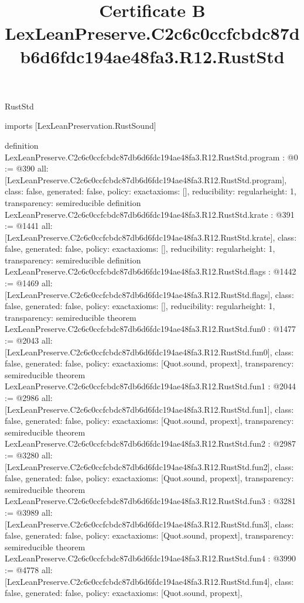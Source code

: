 \begin{lexlean}{RustStd}
\title{Certificate B LexLeanPreserve.C2c6c0ccfcbdc87db6d6fdc194ae48fa3.R12.RustStd}
\begin{coremodule}
imports [LexLeanPreservation.RustSound]

definition LexLeanPreserve.C2c6c0ccfcbdc87db6d6fdc194ae48fa3.R12.RustStd.program : @0 := @390 {
  all: [LexLeanPreserve.C2c6c0ccfcbdc87db6d6fdc194ae48fa3.R12.RustStd.program],
  class: false,
  generated: false,
  policy: exact{axioms: []},
  reducibility: regular{height: 1},
  transparency: semireducible
}
definition LexLeanPreserve.C2c6c0ccfcbdc87db6d6fdc194ae48fa3.R12.RustStd.krate : @391 := @1441 {
  all: [LexLeanPreserve.C2c6c0ccfcbdc87db6d6fdc194ae48fa3.R12.RustStd.krate],
  class: false,
  generated: false,
  policy: exact{axioms: []},
  reducibility: regular{height: 1},
  transparency: semireducible
}
definition LexLeanPreserve.C2c6c0ccfcbdc87db6d6fdc194ae48fa3.R12.RustStd.flags : @1442 := @1469 {
  all: [LexLeanPreserve.C2c6c0ccfcbdc87db6d6fdc194ae48fa3.R12.RustStd.flags],
  class: false,
  generated: false,
  policy: exact{axioms: []},
  reducibility: regular{height: 1},
  transparency: semireducible
}
theorem LexLeanPreserve.C2c6c0ccfcbdc87db6d6fdc194ae48fa3.R12.RustStd.fun0 : @1477 := @2043 {
  all: [LexLeanPreserve.C2c6c0ccfcbdc87db6d6fdc194ae48fa3.R12.RustStd.fun0],
  class: false,
  generated: false,
  policy: exact{axioms: [Quot.sound, propext]},
  transparency: semireducible
}
theorem LexLeanPreserve.C2c6c0ccfcbdc87db6d6fdc194ae48fa3.R12.RustStd.fun1 : @2044 := @2986 {
  all: [LexLeanPreserve.C2c6c0ccfcbdc87db6d6fdc194ae48fa3.R12.RustStd.fun1],
  class: false,
  generated: false,
  policy: exact{axioms: [Quot.sound, propext]},
  transparency: semireducible
}
theorem LexLeanPreserve.C2c6c0ccfcbdc87db6d6fdc194ae48fa3.R12.RustStd.fun2 : @2987 := @3280 {
  all: [LexLeanPreserve.C2c6c0ccfcbdc87db6d6fdc194ae48fa3.R12.RustStd.fun2],
  class: false,
  generated: false,
  policy: exact{axioms: [Quot.sound, propext]},
  transparency: semireducible
}
theorem LexLeanPreserve.C2c6c0ccfcbdc87db6d6fdc194ae48fa3.R12.RustStd.fun3 : @3281 := @3989 {
  all: [LexLeanPreserve.C2c6c0ccfcbdc87db6d6fdc194ae48fa3.R12.RustStd.fun3],
  class: false,
  generated: false,
  policy: exact{axioms: [Quot.sound, propext]},
  transparency: semireducible
}
theorem LexLeanPreserve.C2c6c0ccfcbdc87db6d6fdc194ae48fa3.R12.RustStd.fun4 : @3990 := @4778 {
  all: [LexLeanPreserve.C2c6c0ccfcbdc87db6d6fdc194ae48fa3.R12.RustStd.fun4],
  class: false,
  generated: false,
  policy: exact{axioms: [Quot.sound, propext]},
}
\end{coremodule}
\end{lexlean}
